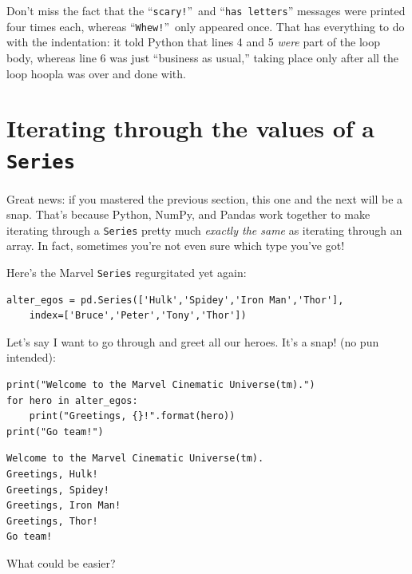 Don't miss the fact that the ``\texttt{scary!}''~and ``\texttt{has 
letters}'' messages were printed four times each, whereas
``\texttt{Whew!}''~only appeared once. That has everything to do with the
indentation: it told Python that lines 4 and 5 \textit{were} part of the loop
body, whereas line 6 was just ``business as usual,'' taking place only after
all the loop hoopla was over and done with.

\section{Iterating through the values of a \texttt{Series}}

\label{seriesLoops}

Great news: if you mastered the previous section, this one and the next will be
a snap. That's because Python, NumPy, and Pandas work together to make
iterating through a \texttt{Series} pretty much \textit{exactly the same} as
iterating through an array. In fact, sometimes you're not even sure which type
you've got!


\pagebreak
Here's the Marvel \texttt{Series} regurgitated yet again:

\begin{Verbatim}[fontsize=\footnotesize,samepage=true,frame=single,framesep=3mm]
alter_egos = pd.Series(['Hulk','Spidey','Iron Man','Thor'],
    index=['Bruce','Peter','Tony','Thor'])
\end{Verbatim}


Let's say I want to go through and greet all our heroes. It's a snap! (no pun
intended):

\begin{Verbatim}[fontsize=\small,samepage=true,frame=single,framesep=3mm]
print("Welcome to the Marvel Cinematic Universe(tm).")
for hero in alter_egos:
    print("Greetings, {}!".format(hero))
print("Go team!")
\end{Verbatim}

\begin{Verbatim}[fontsize=\small,samepage=true,frame=leftline,framesep=5mm,framerule=1mm]
Welcome to the Marvel Cinematic Universe(tm).
Greetings, Hulk!
Greetings, Spidey!
Greetings, Iron Man!
Greetings, Thor!
Go team!
\end{Verbatim}

What could be easier?

